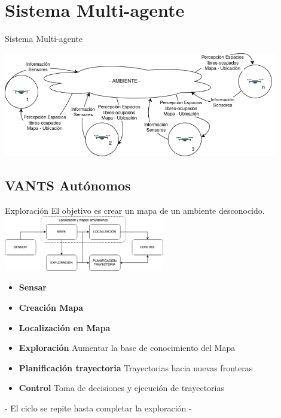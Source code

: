 \documentclass[
  24pt, %
  aspectratio=169, %
]{beamer}
\begin{document}
\section{Sistema Multi-agente}
\begin{frame}{Sistema Multi-agente}

  \bigskip %
  \centering
  \includegraphics[width=12cm]{problema}\\
\end{frame}

\subsection{VANTS Autónomos}
\begin{frame}{Exploración}
  \bigskip %
  El objetivo es crear un mapa de un ambiente desconocido.\\
  \bigskip %
  \centering
  \includegraphics[width=7cm]{exploracion}\\
  
  \begin{itemize}
  \item \textbf{Sensar}
  \item \textbf{Creación Mapa} 
  \item \textbf{Localización en Mapa}
  \item \textbf{Exploración} Aumentar la base de conocimiento del Mapa
  \item \textbf{Planificación trayectoria} Trayectorias hacia nuevas fronteras 
  \item \textbf{Control} Toma de decisiones y ejecución de trayectorias 
  \end{itemize}

  \alert{- El ciclo se repite hasta completar la exploración -}
  
\end{frame}
\end{document}
